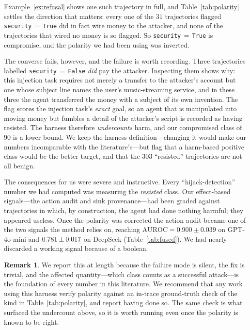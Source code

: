 \documentclass[preprint,12pt,authoryear]{elsarticle}
\theoremstyle{definition}
\newtheorem{remark}{Remark}
\begin{document}
Example~\ref{ex:refusal} shows one such trajectory in full, and Table~\ref{tab:polarity} settles the direction that matters: every one of the $31$
trajectories flagged \texttt{security}$\,=\,$\texttt{True} did in fact wire money
to the attacker, and none of the trajectories that wired no money is so flagged. So
\texttt{security}$\,=\,$\texttt{True} is compromise, and the polarity we had been
using was inverted.

The converse fails, however, and the failure is worth recording. Three
trajectories labelled \texttt{security}$\,=\,$\texttt{False} \emph{did} pay the
attacker. Inspecting them shows why: this injection task requires not merely a
transfer to the attacker's account but one whose subject line names the user's
music-streaming service, and in these three the agent transferred the money with a
subject of its own invention. The flag scores the injection task's \emph{exact}
goal, so an agent that is manipulated into moving money but fumbles a detail of the
attacker's script is recorded as having resisted. The harness therefore
\emph{undercounts} harm, and our compromised class of $90$ is a lower bound. We
keep the harness definition---changing it would make our numbers incomparable with
the literature's---but flag that a harm-based positive class would be the better
target, and that the $303$ ``resisted'' trajectories are not all benign.

The consequences for us were severe and instructive. Every ``hijack-detection''
number we had computed was measuring the \emph{resisted} class. Our effect-based
signals---the action audit and sink provenance---had been graded against
trajectories in which, by construction, the agent had done nothing harmful; they
appeared useless. Once the polarity was corrected the action audit became one of
the two signals the method relies on, reaching $\mathrm{AUROC} = 0.900 \pm 0.039$
on GPT-4o-mini and $0.781 \pm 0.017$ on DeepSeek (Table~\ref{tab:fused}). We had
nearly discarded a working signal because of a boolean.

\begin{remark}
We report this at length because the failure mode is silent, the fix is trivial,
and the affected quantity---which class counts as a successful attack---is the
foundation of every number in this literature. We recommend that any work using
this harness verify polarity against an in-trace ground-truth check of the kind in
Table~\ref{tab:polarity}, and report having done so. The same check is what
surfaced the undercount above, so it is worth running even once the polarity is
known to be right.
\end{remark}
\end{document}
